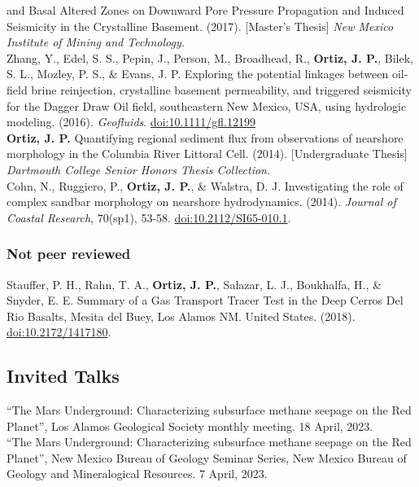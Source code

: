 \documentclass[11pt, letterpaper]{article}
\newcommand{\years}[1]{\marginnote{\scriptsize #1}}
\begin{document}
and Basal Altered Zones on Downward Pore Pressure Propagation and Induced
Seismicity in the Crystalline Basement. (2017). [Master's Thesis] \emph{New
    Mexico Institute of Mining and Technology.}\\ 
%
\years{2016}Zhang, Y., Edel, S. S., Pepin, J., Person, M., Broadhead, R.,
\textbf{Ortiz, J. P.}, Bilek, S. L., Mozley, P. S., \& Evans, J.  P. Exploring
the potential linkages between oil-field brine reinjection, crystalline
basement permeability, and triggered seismicity for the Dagger Draw Oil field,
southeastern New Mexico, USA, using hydrologic modeling. (2016). \emph{Geofluids}.
\href{https://onlinelibrary.wiley.com/doi/epdf/10.1111/gfl.12199}{doi:10.1111/gfl.12199}\\
%
\years{2014}\textbf{Ortiz, J. P.} Quantifying regional sediment flux from
observations of nearshore morphology in the Columbia River Littoral Cell.
(2014). [Undergraduate Thesis] \emph{Dartmouth College Senior Honors Thesis
Collection.}\\ 
%
\years{2014}Cohn, N., Ruggiero, P., \textbf{Ortiz, J. P.}, \& Walstra, D. J.
Investigating the role of complex sandbar morphology on nearshore
hydrodynamics. (2014). \emph{Journal of Coastal Research}, 70(sp1), 53-58.
\href{https://bioone.org/journalArticle/Download?urlId=10.2112%2FSI65-010.1}{doi:10.2112/SI65-010.1}.

\subsubsection*{Not peer reviewed}
%
\years{2018}Stauffer, P. H., Rahn, T. A., \textbf{Ortiz, J. P.}, Salazar, L.
J., Boukhalfa, H., \& Snyder, E. E. Summary of a Gas Transport Tracer Test in
the Deep Cerros Del Rio Basalts, Mesita del Buey, Los Alamos NM. United States.
(2018). \href{https://www.osti.gov/servlets/purl/1417180}{doi:10.2172/1417180}.\\
%

\hypersetup{linkcolor=black,citecolor=blue,filecolor=black,urlcolor=blue} 


\subsection*{Invited Talks}
\label{sec:invitedTalks}
\years{2023} ``The Mars Underground: Characterizing subsurface methane seepage
on the Red Planet'', Los Alamos Geological Society monthly meeting. 18 April,
2023.\\ 
%
\years{2023} ``The Mars Underground: Characterizing subsurface methane seepage
on the Red Planet'', New Mexico Bureau of Geology Seminar Series, New
Mexico Bureau of Geology and Mineralogical Resources. 7 April, 2023.\\
%
\end{document}
